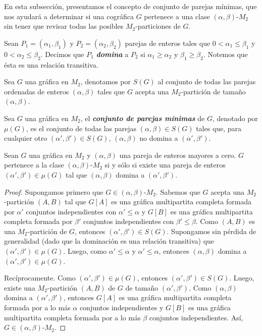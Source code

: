 En esta subsección, presentamos el concepto de conjunto de parejas mínimas, que nos ayudará a determinar si una cográfica $G$ pertenece a una clase $(\alpha, \beta)$-$M_2$ sin tener que revisar todas las posibles $M_2$-particiones de $G$.

Sean $P_1=(\alpha_1, \beta_1)$ y $P_2=(\alpha_2, \beta_2)$ parejas de enteros tales que $0 < \alpha_1 \le \beta_1$ y $0 < \alpha_2 \le \beta_2$. Decimos que $P_1$ \emph{\textbf{domina}} a $P_2$ si $\alpha_1 \geq \alpha_2$ y $\beta_1 \geq \beta_2$. Notemos que ésta es una relación transitiva.

Sea $G$ una gráfica en $M_2$, denotamos por $S(G)$ al conjunto de todas las parejas ordenadas de enteros $(\alpha, \beta)$ tales que $G$ acepta una $M_2$-partición de tamaño $(\alpha, \beta)$.

Sea $G$ una gráfica en $M_2$, el \textbf{\emph{conjunto de parejas mínimas}} de $G$, denotado por $\mu(G)$, es el conjunto de todas las parejas $(\alpha, \beta)\in S(G)$ tales que, para cualquier otro $(\alpha', \beta')\in S(G)$, $(\alpha, \beta)$ no domina a $(\alpha', \beta')$.

\begin{lemma}
Sean $G$ una gráfica en $M_2$ y $(\alpha, \beta)$ una pareja de enteros mayores a cero. $G$ pertenece a la clase $(\alpha, \beta)$-$M_2$ si y sólo si existe una pareja de enteros $(\alpha', \beta')\in \mu(G)$ tal que $(\alpha, \beta)$ domina a $(\alpha', \beta')$.
\end{lemma}

\begin{proof}
Supongamos primero que $G\in (\alpha, \beta)\text{-}M_2$. Sabemos que $G$ acepta una $M_2$-partición $(A,B)$ tal que $G[A]$ es una gráfica multipartita completa formada por $\alpha'$ conjuntos independientes con $\alpha' \le \alpha$ y $G[B]$ es una gráfica multipartita completa formada por $\beta'$ conjuntos independientes con $\beta' \le \beta$. Como $(A,B)$ es una $M_2$-partición de $G$, entonces $(\alpha', \beta')\in S(G)$. Supongamos sin pérdida de generalidad (dado que la dominación es una relación transitiva) que $(\alpha', \beta')\in \mu(G)$. Luego, como $\alpha' \le \alpha$ y $\alpha' \le \alpha$, entonces $(\alpha, \beta)$ domina a $(\alpha', \beta') \in \mu(G)$.

Recíprocamente. Como $(\alpha', \beta')\in \mu(G)$, entonces $(\alpha', \beta')\in S(G)$. Luego, existe una $M_2$-partición $(A,B)$ de $G$ de tamaño $(\alpha', \beta')$. Como $(\alpha, \beta)$ domina a $(\alpha', \beta')$, entonces $G[A]$ es una gráfica multipartita completa formada por a lo más $\alpha$ conjuntos independientes y $G[B]$ es una gráfica multipartita completa formada por a lo más $\beta$ conjuntos independientes. Así, $G\in (\alpha, \beta)\text{-}M_2$.
\end{proof}


